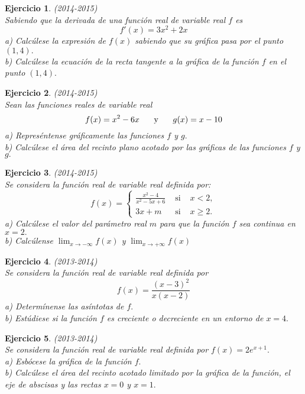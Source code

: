 \documentclass[12pt, a4paper]{amsart}
\newtheorem{ejer}{Ejercicio}
\begin{document}
\begin{ejer}\em (2014-2015)\\
Sabiendo que la derivada de una función real de variable real $f$ es
\[f'(x)=3x^2+2x\]
a) Calcúlese la expresión de $f(x)$ sabiendo que su gráfica pasa por el punto $(1, 4).$\\
b) Calcúlese la ecuación de la recta tangente a la gráfica de la función $f$ en el punto $(1, 4).$
\end{ejer}

\begin{ejer}\em (2014-2015)\\
Sean las funciones reales de variable real
\[f(x)=x^2-6x \hspace*{5mm}\text{ y }\hspace*{5mm} g(x)=x-10\]
a) Represéntense gráficamente las funciones $f$ y $g.$\\
b) Calcúlese el área del recinto plano acotado por las gráficas de las funciones $f$ y $g.$
\end{ejer}

\begin{ejer}\em (2014-2015)\\
Se considera la función real de variable real definida por:
\[f(x)=\left \{ \begin{matrix}
\frac{x^2-4}{x^2-5x+6} & \text{ si } & x<2,\\
3x+m & \text{ si } & x\geq 2.
\end{matrix}\right.\]
a) Calcúlese el valor del parámetro real $m$ para que la función $f$ sea continua en $x = 2.$\\
b) Calcúlense $\lim_{x\to -\infty}f(x)$ y $\lim_{x\to +\infty}f(x)$
\end{ejer}

\begin{ejer}\em (2013-2014)\\
Se considera la función real de variable real definida por
\[f(x)=\frac{(x-3)^2}{x(x-2)}\]
a) Determínense las asíntotas de $f.$\\
b) Estúdiese si la función $f$ es creciente o decreciente en un entorno de $x=4.$
\end{ejer}

\begin{ejer}\em (2013-2014)\\
Se considera la función real de variable real definida por $f(x)=2e^{x+1}.$\\
a) Esbócese la gráfica de la función $f.$\\
b) Calcúlese el área del recinto acotado limitado por la gráfica de la función, el eje de abscisas y las rectas $x=0$ y $x=1.$
\end{ejer}
\end{document}
